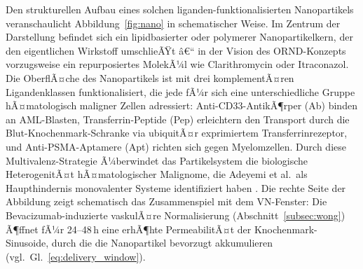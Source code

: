 ﻿\documentclass[12pt,a4paper]{article}
\theoremstyle{definition}
\begin{document}
Den strukturellen Aufbau eines solchen liganden-funktionalisierten Nanopartikels
veranschaulicht Abbildung~\ref{fig:nano} in schematischer Weise. Im Zentrum der
Darstellung befindet sich ein lipidbasierter oder polymerer Nanopartikelkern, der
den eigentlichen Wirkstoff umschlieÃŸt â€“ in der Vision des ORND-Konzepts vorzugsweise
ein repurposiertes MolekÃ¼l wie Clarithromycin oder Itraconazol. Die OberflÃ¤che des
Nanopartikels ist mit drei komplementÃ¤ren Ligandenklassen funktionalisiert, die
jede fÃ¼r sich eine unterschiedliche Gruppe hÃ¤matologisch maligner Zellen adressiert:
Anti-CD33-AntikÃ¶rper (Ab) binden an AML-Blasten, Transferrin-Peptide (Pep)
erleichtern den Transport durch die Blut-Knochenmark-Schranke via ubiquitÃ¤r
exprimiertem Transferrinrezeptor, und Anti-PSMA-Aptamere (Apt) richten sich gegen
Myelomzellen. Durch diese Multivalenz-Strategie Ã¼berwindet das Partikelsystem die
biologische HeterogenitÃ¤t hÃ¤matologischer Malignome, die Adeyemi et al.\ als
Haupthindernis monovalenter Systeme identifiziert haben \cite{adeyemi2025}.
Die rechte Seite der Abbildung zeigt schematisch das Zusammenspiel mit dem
VN-Fenster: Die Bevacizumab-induzierte vaskulÃ¤re Normalisierung (Abschnitt~\ref{subsec:wong})
Ã¶ffnet fÃ¼r 24--48\,h eine erhÃ¶hte PermeabilitÃ¤t der Knochenmark-Sinusoide,
durch die die Nanopartikel bevorzugt akkumulieren (vgl.~Gl.~\eqref{eq:delivery_window}).
\end{document}
